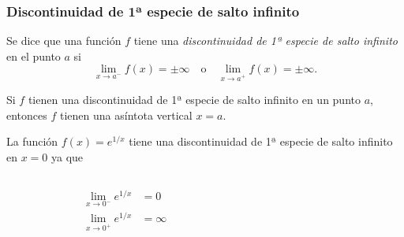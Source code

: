 	
	\begin{frame}
		\frametitle{Discontinuidad de 1ª especie de salto infinito}
		\begin{definicion}
			Se dice que una función $f$ tiene una \emph{discontinuidad de 1ª especie de salto infinito} en el punto $a$ si
			\[\lim_{x\rightarrow a^-}f(x)=\pm\infty \quad \textrm{o} \quad \lim_{x\rightarrow a^+}f(x)=\pm\infty.\]
		\end{definicion}
		
		Si $f$ tienen una discontinuidad de 1ª especie de salto infinito en un punto $a$, entonces $f$ tienen una asíntota vertical $x=a$.
		
		 La función $f(x)=e^{1/x}$ tiene una discontinuidad de 1ª especie de salto infinito en $x=0$ ya que
		\begin{columns}
			\begin{column}{0.3\textwidth}
				\begin{align*}
					\lim_{x\rightarrow 0^-}e^{1/x} & = 0      \\
					\lim_{x\rightarrow 0^+}e^{1/x} & = \infty 
				\end{align*}
			\end{column}
			\begin{column}{0.5\textwidth}
				\begin{center}
					\scalebox{1}{}
				\end{center}
			\end{column}
		\end{columns}
	\end{frame}
	
